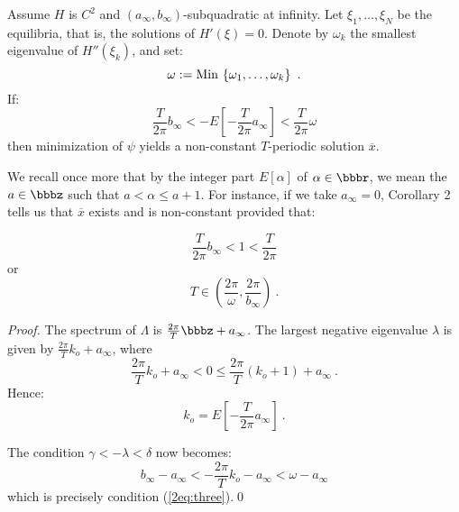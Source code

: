 \documentclass{llncs}
\begin{document}
    \begin{corollary}
    Assume $H$ is $C^{2}$ and
    $\left(a_{\infty},b_{\infty}\right)$-subquadratic at infinity. Let
    $\xi_{1},\allowbreak\dots,\allowbreak\xi_{N}$  be the
    equilibria, that is, the solutions of $H' (\xi ) = 0$.
    Denote by $\omega_{k}$
    the smallest eigenvalue of $H'' \left(\xi_{k}\right)$, and set:
    \begin{equation}
      \omega : = {\rm Min\,} \left\{\omega_{1},\dots,\omega_{k}\right\}\ .
    \end{equation}
    If:
    \begin{equation}
      \frac{T}{2\pi} b_{\infty} <
      - E \left[- \frac{T}{2\pi}a_{\infty}\right] <
      \frac{T}{2\pi}\omega
      \label{2eq:three}
    \end{equation}
    then minimization of $\psi$ yields a non-constant $T$-periodic solution
    $\overline{x}$.
    \end{corollary}
    
    We recall once more that by the integer part $E [\alpha ]$ of
    $\alpha \in \bbbr$, we mean the $a\in \bbbz$
    such that $a< \alpha \le a+1$. For instance,
    if we take $a_{\infty} = 0$, Corollary 2 tells
    us that $\overline{x}$ exists and is
    non-constant provided that:
    
    \begin{equation}
      \frac{T}{2\pi} b_{\infty} < 1 < \frac{T}{2\pi}
    \end{equation}
    or
    \begin{equation}
      T\in \left(\frac{2\pi}{\omega},\frac{2\pi}{b_{\infty}}\right)\ .
      \label{2eq:four}
    \end{equation}
    
    \begin{proof}
    The spectrum of $\Lambda$ is $\frac{2\pi}{T} \bbbz +a_{\infty}$. The
    largest negative eigenvalue $\lambda$ is given by
    $\frac{2\pi}{T}k_{o} +a_{\infty}$,
    where
    \begin{equation}
      \frac{2\pi}{T}k_{o} + a_{\infty} < 0
      \le \frac{2\pi}{T} (k_{o} +1) + a_{\infty}\ .
    \end{equation}
    Hence:
    \begin{equation}
      k_{o} = E \left[- \frac{T}{2\pi} a_{\infty}\right] \ .
    \end{equation}
    
    The condition $\gamma < -\lambda < \delta$ now becomes:
    \begin{equation}
      b_{\infty} - a_{\infty} <
      - \frac{2\pi}{T} k_{o} -a_{\infty} < \omega -a_{\infty}
    \end{equation}
    which is precisely condition (\ref{2eq:three}).\qed
    \end{proof}
    
\end{document}

